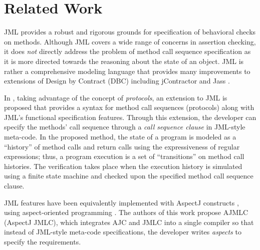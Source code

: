 
\section{Related Work} \label{sec:relworks}

JML \cite{leavens_baker_ruby_jml_design} provides a robust and rigorous grounds for specification of behavioral checks on methods. 
Although JML covers a wide range of concerns in assertion checking, it does \textit{not} directly address the problem of method call sequence specification  as it is more directed towards the reasoning about the state of an object. 
JML is rather a comprehensive modeling language that provides many improvements to extensions of Design by Contract (DBC) \cite{dbc} including jContractor \cite{jcontractor} and Jass \cite{jass}.

In \cite{yoonsik_ash_mscs}, taking advantage of the concept of
\textit{protocols}, an extension to JML is proposed that provides a syntax for
method call sequences (protocols) along with JML's functional specification
features. Through this extension, the developer can specify the methods' call
sequence through a \textsl{call sequence clause} in JML-style meta-code. In the
proposed method, the state of a program is modeled as a ``history'' of method
calls and return calls using the expressiveness of regular expressions; thus, a
program execution is a set of ``transitions'' on method call histories. The
verification takes place when the execution history is simulated using a finite
state machine and checked upon the specified method call sequence clause.

JML features have been equivalently implemented with AspectJ constructs
\cite{jml_aspects}, using aspect-oriented programming \cite{kiczales_aspectj}.
The authors of this work propose AJMLC (AspectJ JMLC), which integrates AJC and JMLC into a single compiler
so that instead of JML-style meta-code specifications, the developer writes 
\textsl{aspects} to specify the requirements. 


